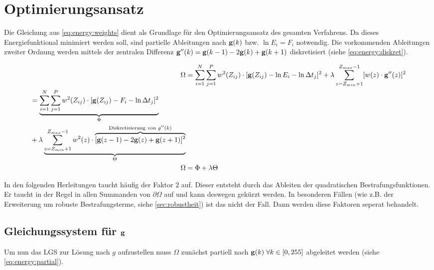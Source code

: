 \section{Optimierungsansatz}
\label{sec:ansatz}
Die Gleichung aus \autoref{eq:energy:weights} dient als Grundlage für den Optimierungsansatz des gesamten Verfahrens. Da dieses Energiefunktional minimiert werden soll, sind partielle Ableitungen nach $\mathbf g(k)$ bzw. $\ln E_i = F_i$ notwendig. Die vorkommenden Ableitungen zweiter Ordnung werden mittels der zentralen Differenz $\mathbf g''(k) = \mathbf g(k-1) - 2\mathbf g(k) +\mathbf g(k+1)$ diskretisiert (siehe \autoref{eq:energy:diskret}).

\begin{align}
\Omega &= \sum \limits_{i=1}^{N} \sum \limits_{j=1}^{P}w^2(Z_{ij})\cdot[\mathbf g(Z_{ij}) - \ln E_i - \ln \Delta t_j]^2 + \lambda  \sum \limits_{z=Z_{min}+1}^{Z_{max}-1} [w(z) \cdot \mathbf g''(z)]^2\\
\label{eq:energy:diskret}
\begin{split}
 &= \underbrace{\sum \limits_{i=1}^{N} \sum \limits_{j=1}^{P}w^2(Z_{ij})\cdot[\mathbf g(Z_{ij}) - F_i - \ln \Delta t_j]^2}_{\Phi} \\
 &+ \lambda \underbrace{ \sum \limits_{z=Z_{min}+1}^{Z_{max}-1} w^2(z) \cdot \overbrace{
 	[\mathbf g(z-1)-2\mathbf g(z)+\mathbf g(z+1)]^2
 }^{
 	\text{Diskretisierung von }g''(k)
 }
 }_{\Theta}
 \end{split}\\
 \Omega &= \Phi + \lambda \Theta
\end{align}

In den folgenden Herleitungen taucht häufig der Faktor $2$ auf. Dieser entsteht durch das Ableiten der quadratischen Bestrafungsfunktionen. Er taucht in der Regel in allen Summanden von $\partial \Omega$ auf und kann deswegen gekürzt werden. In besonderen Fällen (wie z.B. der Erweiterung um robuste Bestrafungsterme, siehe \autoref{sec:robustheit}) ist das nicht der Fall. Dann werden diese Faktoren seperat behandelt.

\subsection{Gleichungssystem für $\mathbf g$}
Um nun das \gls{LGS} zur Lösung nach $g$ aufzustellen muss $\Omega$ zunächst partiell nach $\mathbf g(k) \; \forall k \in [0,255]$ abgeleitet werden (siehe \autoref{eq:energy:partial}).

